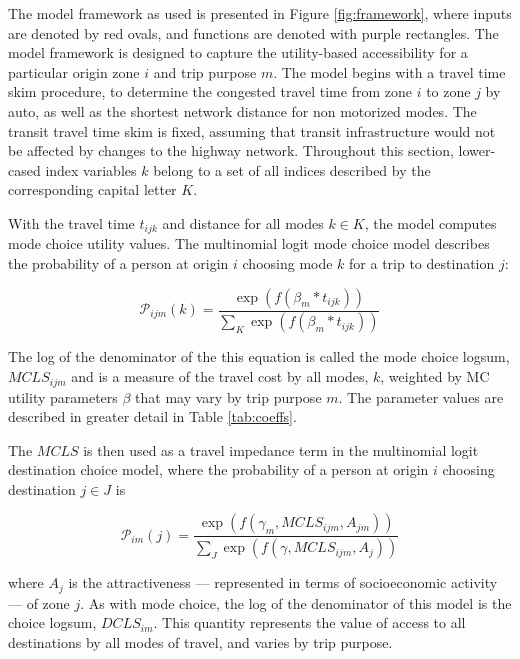 The model framework as used is presented in Figure \ref{fig:framework}, where
inputs are denoted by red ovals, and functions are denoted with purple rectangles.
The model framework is designed to capture the utility-based accessibility for
a particular origin zone \(i\) and trip purpose \(m\). The model begins with a
travel time skim procedure, to determine the congested travel time from zone
\(i\) to zone \(j\) by auto, as well as the shortest network distance for non
motorized modes. The transit travel time skim is fixed, assuming that transit
infrastructure would not be affected by changes to the highway network.
Throughout this section, lower-cased index variables \(k\) belong to a set of
all indices described by the corresponding capital letter \(K\).

With the travel time \(t_{ijk}\) and distance for all modes \(k \in K\), the
model computes mode choice utility values. The multinomial logit mode choice
model describes the probability of a person at origin \(i\) choosing mode \(k\)
for a trip to destination \(j\):

\begin{equation}
\mathcal{P}_{ijm}(k) = \frac{\exp(f(\beta_m * t_{ijk}))}
{\sum_{K}\exp(f(\beta_m * t_{ijk}))}
  \label{eq:mcp}
\end{equation}

\noindent The log of the denominator of the this equation is called the
mode choice logsum, \(MCLS_{ijm}\) and is a measure of the travel cost by
all modes, $k$, weighted by MC utility parameters \(\beta\) that may vary by
trip purpose $m$. The parameter values are described in greater detail in
Table \ref{tab:coeffs}.

The \(MCLS\) is then used as a travel impedance term in the multinomial
logit
destination choice model, where the probability of a person at origin \(i\)
choosing destination \(j \in J\) is

\begin{equation}
\mathcal{P}_{im}(j) = \frac{\exp(f(\gamma_m, MCLS_{ijm}, A_{jm}))}
{\sum_{J}\exp(f(\gamma, MCLS_{ijm}, A_j))}
  \label{eq:dcp}
\end{equation}

\noindent where \(A_j\) is the attractiveness --- represented in terms of
socioeconomic activity --- of zone \(j\). As with mode choice, the log of the
denominator of this model is the
choice logsum, \(DCLS_{im}\). This quantity represents the value of access to
all destinations
by all modes of travel, and varies by trip purpose.

